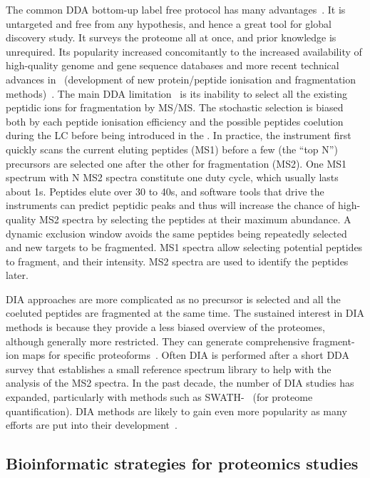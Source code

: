 The common \gls{DDA} bottom-up label free protocol
has many advantages~.
It is untargeted and free from any hypothesis,
and hence a great tool for global discovery study.
It surveys the proteome all at once,
and prior knowledge is unrequired.
Its popularity increased concomitantly to the increased availability of
high-quality genome and gene sequence databases
and more recent technical advances in \ms\
(development of new protein/peptide ionisation
and fragmentation methods)~.
The main \gls{DDA} limitation~\mycite{Guillaumot2017-ba} is its inability
to select all the existing peptidic ions for fragmentation by \gls{MS/MS}.
The stochastic selection is biased both by
each peptide ionisation efficiency
and the possible peptides coelution
during the \gls{LC} before being introduced in the \ms.
In practice, the instrument first quickly scans the current eluting peptides (MS1)
before a few (the ``top N'') precursors are selected
one after the other for fragmentation (MS2).
One MS1 spectrum with N MS2 spectra constitute one duty cycle,
which usually lasts about 1s.
Peptides elute over 30 to 40s,
and software tools that drive the instruments can predict peptidic peaks
and thus will increase the chance of high-quality MS2 spectra
by selecting the peptides at their maximum abundance.
A dynamic exclusion window avoids the same peptides being repeatedly selected and
new targets to be fragmented.
MS1 spectra allow selecting potential peptides to fragment, and their intensity.
MS2 spectra are used to identify the peptides later.\mybr\

\gls{DIA} approaches are more complicated
as no precursor is selected and
all the coeluted peptides are fragmented at the same time.
The sustained interest in \gls{DIA} methods is because
they provide a less biased overview of the proteomes,
although generally more restricted.
They can generate comprehensive fragment-ion maps for
specific proteoforms~.
Often \gls{DIA} is performed after a short \gls{DDA} survey
that establishes a small reference spectrum library
to help with the analysis of the MS2 spectra.
In the past decade, the number of \gls{DIA} studies has expanded,
particularly with methods such as SWATH-\ms~\mycite{Gillet2012-ce}
(for proteome quantification).
\gls{DIA} methods are likely to gain even more popularity
as many efforts are put into their development~.\mybr\

\subsection{Bioinformatic strategies for proteomics studies}\label{sec:bioinfProt}

